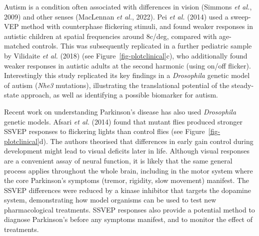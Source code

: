 \documentclass[
  letterpaper,
  DIV=11,
  numbers=noendperiod]{scrartcl}
\begin{document}
Autism is a condition often associated with differences in vision
(Simmons \emph{et al.}, 2009) and other senses (MacLennan \emph{et al.},
2022). Pei \emph{et al.} (2014) used a sweep-VEP method with
counterphase flickering stimuli, and found weaker responses in autistic
children at spatial frequencies around 8c/deg, compared with age-matched
controls. This was subsequently replicated in a further pediatric sample
by Vilidaite \emph{et al.} (2018) (see Figure~\ref{fig-plotclinical}c),
who additionally found weaker responses in autistic adults at the second
harmonic (using on/off flicker). Interestingly this study replicated its
key findings in a \emph{Drosophila} genetic model of autism (\emph{Nhe3}
mutations), illustrating the translational potential of the steady-state
approach, as well as identifying a possible biomarker for autism.

Recent work on understanding Parkinson's disease has also used
\emph{Drosophila} genetic models. Afsari \emph{et al.} (2014) found that
mutant flies produced stronger SSVEP responses to flickering lights than
control flies (see Figure~\ref{fig-plotclinical}d). The authors
theorised that differences in early gain control during development
might lead to visual deficits later in life. Although visual responses
are a convenient assay of neural function, it is likely that the same
general process applies throughout the whole brain, including in the
motor system where the core Parkinson's symptoms (tremor, rigidity, slow
movement) manifest. The SSVEP differences were reduced by a kinase
inhibitor that targets the dopamine system, demonstrating how model
organisms can be used to test new pharmacological treatments. SSVEP
responses also provide a potential method to diagnose Parkinson's before
any symptoms manifest, and to monitor the effect of treatments.
\end{document}
